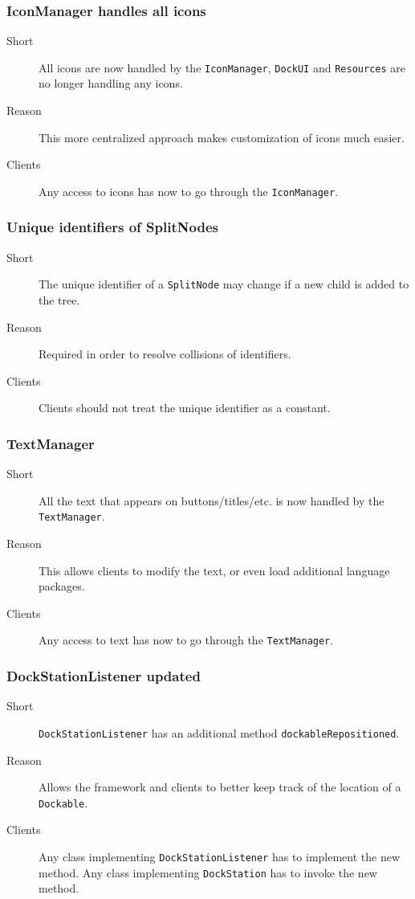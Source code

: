 \documentclass[a4paper,10pt]{article}
\newcommand{\src}[1]{\lstinline[basicstyle=\normalsize\ttfamily,keywordstyle=\normalsize\ttfamily,identifierstyle=\normalsize\ttfamily]|#1|}
\newcommand{\short}{\item[Short]}
\newcommand{\why}{\item[Reason]}
\newcommand{\clients}{\item[Clients]}
\begin{document}
\subsubsection{IconManager handles all icons}
\begin{description}
 \short All icons are now handled by the \src{IconManager}, \src{DockUI} and \src{Resources} are no longer handling any icons.
 \why This more centralized approach makes customization of icons much easier.
 \clients Any access to icons has now to go through the \src{IconManager}.
\end{description}

\subsubsection{Unique identifiers of SplitNodes}
\begin{description}
 \short The unique identifier of a \src{SplitNode} may change if a new child is added to the tree.
 \why Required in order to resolve collisions of identifiers.
 \clients Clients should not treat the unique identifier as a constant.
\end{description}

\subsubsection{TextManager}
\begin{description}
 \short All the text that appears on buttons/titles/etc. is now handled by the \src{TextManager}.
 \why This allows clients to modify the text, or even load additional language packages.
 \clients Any access to text has now to go through the \src{TextManager}.
\end{description}

\subsubsection{DockStationListener updated}
\begin{description}
 \short \src{DockStationListener} has an additional method \linebreak \src{dockableRepositioned}.
 \why Allows the framework and clients to better keep track of the location of a \src{Dockable}.
 \clients Any class implementing \src{DockStationListener} has to implement the new method. Any class implementing \src{DockStation} has to invoke the new method.
\end{description}
\end{document}
